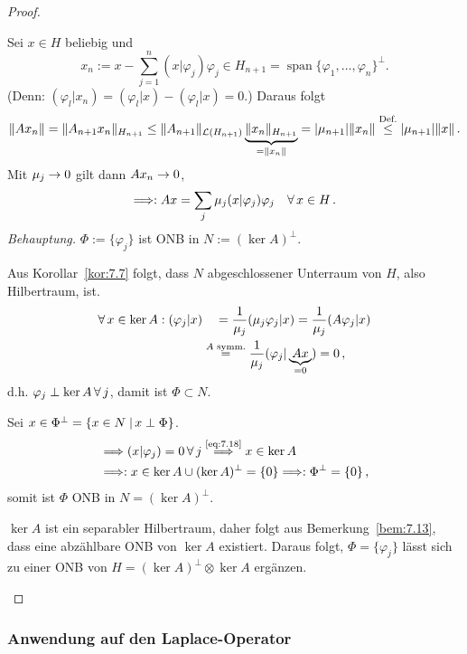 \begin{proof}
\begin{enumerate}
Sei $x \in H$ beliebig und
\[
	x_n := x  - \sum_{j=1}^n (x\vert \varphi_j) \varphi_j \in H_{n+1} = \operatorname{span} \{\varphi_1,\ldots, \varphi_n\}^\perp .
\]
(Denn: $(\varphi_l \vert x_n) =( \varphi_l\vert x) - (\varphi_l\vert x) = 0$.) Daraus folgt
\begin{dmath*}
 \norm{Ax_n} = \norm{A_{n+1}x_n}_{H_{n+1}} \leq \norm{A_{n+1}}_{\mathcal L(H_{n+1})} \underbrace{\norm{x_n}_{H_{n+1}}}_{=\norm{x_n}} = \abs{\mu_{n+1}} \norm{x_n} \stackrel{\scriptsize\text{Def.}}\leq \abs{\mu_{n+1}} \norm x\, .
\end{dmath*}
Mit $\mu_j \rightarrow 0$ gilt dann $Ax_n \rightarrow 0$,
\begin{align}
\label{eq:7.18}
\Longrightarrow: Ax = \sum_j \mu_j (x\vert \varphi_j)\varphi_j \quad \forall \, x \in H \, .
\end{align}
\textit{Behauptung.} $\Phi := \{\varphi_j\}$ ist ONB in $N:= (\ker A)^\perp$.

Aus Korollar~\ref{kor:7.7} folgt, dass $N$ abgeschlossener Unterraum von $H$, also Hilbertraum, ist.
\begin{align*}
	\forall \, x \in \ker A : (\varphi_j \vert x) & \ \,  \, \ = \frac 1{\mu_j} (\mu_j \varphi_j\vert x) 
	= \frac 1{\mu_j} (A\varphi_j \vert x) \\
	&  \stackrel{\scriptsize A\text{ symm.}}= \frac 1{\mu_j} (\varphi_j \vert \underbrace{Ax}_{=0}) = 0 \, , 
\end{align*}
d.h. $\varphi_j \perp \ker A \, \forall \, j$, damit ist $\Phi \subset N$.

Sei $x \in \Phi^\perp = \{ x \in N \;\vert\, x \perp \Phi\}$.
\begin{align*}
 & \Longrightarrow (x \vert \varphi_j) = 0 \, \forall \, j \stackrel{\scriptsize\eqref{eq:7.18}}{\Longrightarrow} x \in \ker A \\ 
 & \Longrightarrow: x \in \ker A \cup (\ker A)^\perp = \{0\} \Longrightarrow: \Phi^\perp = \{ 0\} \, ,
\end{align*}
somit ist $\Phi$ ONB in $N = (\ker A)^\perp$.

$\ker A$ ist ein separabler Hilbertraum, daher folgt aus Bemerkung~\ref{bem:7.13}, dass eine abzählbare ONB von $\ker A$ existiert. Daraus folgt, $\Phi = \{\varphi_j\}$ lässt sich zu einer ONB von $H =(\ker A)^\perp \otimes \ker A$ ergänzen.\qedhere
\end{enumerate} 
\end{proof}

\subsubsection{Anwendung auf den Laplace-Operator}

